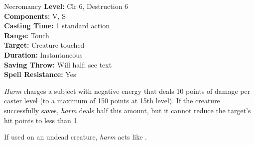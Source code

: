 {Necromancy}
{
	\textbf{Level:}
	Clr 6, Destruction 6\\
	\textbf{Components:}
	V, S\\
	\textbf{Casting Time:}
	1 standard action\\
	\textbf{Range:}
	Touch\\
	\textbf{Target:}
	Creature touched\\
	\textbf{Duration:}
	Instantaneous\\
	\textbf{Saving Throw:}
	Will half; see text\\
	\textbf{Spell Resistance:}
	Yes\\
}
{
	\emph{Harm} charges a subject with negative energy that deals 10 points of damage per caster level (to a maximum of 150 points at 15th level). If the creature successfully saves, \emph{harm} deals half this amount, but it cannot reduce the target's hit points to less than 1.

	If used on an undead creature, \emph{harm} acts like .

}
